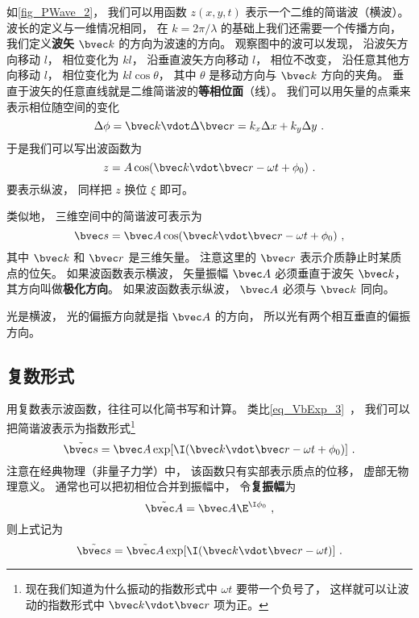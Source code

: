 如\autoref{fig_PWave_2}， 我们可以用函数 $z(x,y,t)$ 表示一个二维的简谐波（横波）。 波长的定义与一维情况相同， 在 $k = 2\pi/\lambda$ 的基础上我们还需要一个传播方向， 我们定义\textbf{波矢} $\bvec k$ 的方向为波速的方向。
观察图中的波可以发现， 沿波矢方向移动 $l$， 相位变化为 $kl$， 沿垂直波矢方向移动 $l$， 相位不改变， 沿任意其他方向移动 $l$， 相位变化为 $kl\cos\theta$， 其中 $\theta$ 是移动方向与 $\bvec k$ 方向的夹角。 垂直于波矢的任意直线就是二维简谐波的\textbf{等相位面}（线）。 我们可以用矢量的点乘来表示相位随空间的变化
\begin{equation}
\Delta\phi = \bvec k \vdot \Delta\bvec r = k_x \Delta x + k_y \Delta y~.
\end{equation}
于是我们可以写出波函数为
\begin{equation}\label{eq_PWave_8}
z = A \cos(\bvec k \vdot \bvec r - \omega t + \phi_0)~.
\end{equation}
要表示纵波， 同样把 $z$ 换位 $\xi$ 即可。

类似地， 三维空间中的简谐波可表示为
\begin{equation}
\bvec s = \bvec A \cos(\bvec k \vdot \bvec r - \omega t + \phi_0)~,
\end{equation}
其中 $\bvec k$ 和 $\bvec r$ 是三维矢量。 注意这里的 $\bvec r$ 表示介质静止时某质点的位矢。 如果波函数表示横波， 矢量振幅 $\bvec A$ 必须垂直于波矢 $\bvec k$， 其方向叫做\textbf{极化方向}。 如果波函数表示纵波， $\bvec A$ 必须与 $\bvec k$ 同向。

光是横波， 光的偏振方向就是指 $\bvec A$ 的方向， 所以光有两个相互垂直的偏振方向。

\subsection{复数形式}\label{sub_PWave_2}

用复数表示波函数，往往可以化简书写和计算。 类比\autoref{eq_VbExp_3}~， 我们可以把简谐波表示为指数形式\footnote{现在我们知道为什么振动的指数形式中 $\omega t$ 要带一个负号了， 这样就可以让波动的指数形式中 $\bvec k\vdot \bvec r$ 项为正。}
\begin{equation}
\tilde {\bvec s} = \bvec A \exp[\I( \bvec k \vdot \bvec r - \omega t + \phi_0)]~.
\end{equation}
注意在经典物理（非量子力学）中， 该函数只有实部表示质点的位移， 虚部无物理意义。 通常也可以把初相位合并到振幅中， 令\textbf{复振幅}为
\begin{equation}
\tilde {\bvec A} = \bvec A \E^{\I \phi_0}~,
\end{equation}
则上式记为
\begin{equation}
\tilde {\bvec s} = \tilde {\bvec A} \exp[\I( \bvec k \vdot \bvec r - \omega t)]~.
\end{equation}
